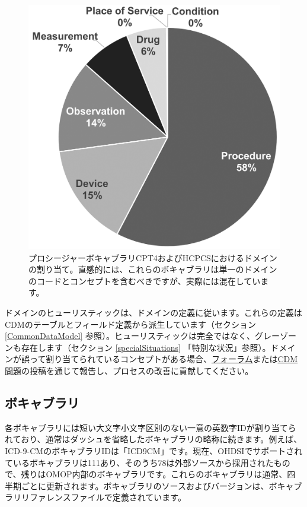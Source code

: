\documentclass[
  11pt]{book}
\theoremstyle{definition}
\theoremstyle{definition}
\theoremstyle{definition}
\theoremstyle{definition}
\theoremstyle{remark}
\begin{document}
\begin{figure}

{\centering \includegraphics[width=0.7\linewidth]{images/StandardizedVocabularies/domains} 

}

\caption{プロシージャーボキャブラリCPT4およびHCPCSにおけるドメインの割り当て。直感的には、これらのボキャブラリは単一のドメインのコードとコンセプトを含むべきですが、実際には混在しています。}\label{fig:domains}
\end{figure}

ドメインのヒューリスティックは、ドメインの定義に従います。これらの定義はCDMのテーブルとフィールド定義から派生しています（セクション \ref{CommonDataModel} 参照）。ヒューリスティックは完全ではなく、グレーゾーンも存在します（セクション \ref{specialSituations} 「特別な状況」参照）。ドメインが誤って割り当てられているコンセプトがある場合、\href{https://forums.ohdsi.org}{フォーラム}または\href{https://github.com/OHDSI/CommonDataModel/issues}{CDM問題}の投稿を通じて報告し、プロセスの改善に貢献してください。

\subsection{ボキャブラリ}\label{ux30dcux30adux30e3ux30d6ux30e9ux30ea}

各ボキャブラリには短い大文字小文字区別のない一意の英数字IDが割り当てられており、通常はダッシュを省略したボキャブラリの略称に続きます。例えば、ICD-9-CMのボキャブラリIDは「ICD9CM」です。現在、OHDSIでサポートされているボキャブラリは111あり、そのうち78は外部ソースから採用されたもので、残りはOMOP内部のボキャブラリです。これらのボキャブラリは通常、四半期ごとに更新されます。ボキャブラリのソースおよびバージョンは、ボキャブラリリファレンスファイルで定義されています。 
\end{document}
